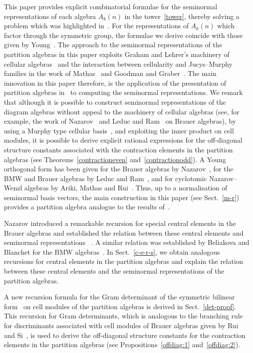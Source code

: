 \documentclass[11pt,a4paper,reqno,svgnames]{amsart}
\theoremstyle{plain}
\theoremstyle{definition}
\numberwithin{equation}{section}
\begin{document}
This paper provides explicit combinatorial formulae for the seminormal representations of each algebra $A_k(n)$ in the tower~\eqref{tower}, thereby solving a problem which was highlighted in~\cite{MR2143201}. For the representations of $A_k(n)$ which factor through the symmetric group, the formulae we derive coincide with those given by Young~\cite{Yo:1932}. The approach to the seminormal representations of the partition algebras in this paper exploits Graham and Lehrer's machinery of cellular algebras~\cite{MR1376244} and the interaction between cellularity and  Jucys--Murphy families in the work of  Mathas~\cite{MR2414949} and Goodman and Graber~\cite{MR2774622}. The main innovation in this paper therefore, is the application of the presentation of partition algebras in~\cite{MR3035512} to computing the seminormal representations. We remark that although it is possible to construct seminormal representations of the diagram algebras without appeal to the machinery of cellular algebras (see, for example, the work of Nazarov~\cite{MR1398116} and Leduc and Ram~\cite{MR1427801} on Brauer algebras), by using a Murphy type cellular basis~\cite{EG:2012}, and exploiting the inner product on cell modules, it is possible to derive explicit rational expressions for the off-diagonal structure constants associated with the contraction elements in the partition algebras (see Theorems~\ref{contractioneven} and~\ref{contractionodd}).   A Young orthogonal form has been given for the Brauer algebras by Nazarov~\cite{MR1398116}, for the BMW and Brauer algebras by Leduc and Ram~\cite{MR1427801}, and for cyclotomic Nazarov--Wenzl algebras by  Ariki, Mathas and Rui~\cite{MR2235339}. Thus, up to a normalisation of seminormal basis vectors, the main construction in this paper (see Sect.~\ref{m-r}) provides a partition algebra analogue to the results of~\cite{MR1398116, MR1427801, MR2235339}.

Nazarov introduced a remarkable recursion for special central elements in the Brauer algebras and established the relation between these central elements and seminormal representations ~\cite[Corollary~3.10, Proposition~4.2]{MR1398116}. A similar relation was established by Beliakova and Blanchet for the BMW algebras~\cite[Lemma~7.4]{MR1866492}. In Sect.~\ref{c-e-r-s}, we obtain analogous recursions for central elements in the partition algebras and explain the relation between these central elements and the seminormal representations of the partition algebras. 

A new recursion formula for the Gram determinant of the symmetric bilinear form~\cite{MR1376244} on cell modules of the partition algebras is derived in Sect.~\ref{det-proof}. This recursion for Gram determinants, which is analogous to the branching rule for discriminants associated with cell modules of Brauer algebras given by Rui and Si~\cite{MR2369064}, is used to derive the off-diagonal structure constants for the contraction elements in the partition algebras (see Propositions~\ref{offdiag:1} and~\ref{offdiag:2}). 
\end{document}
